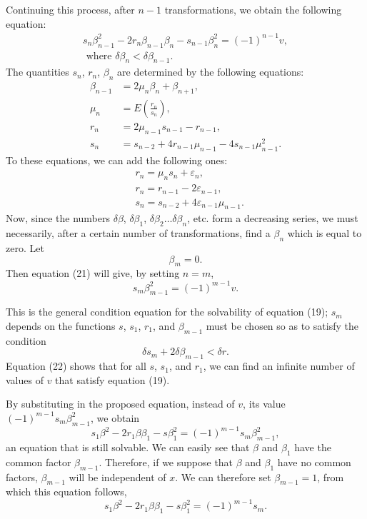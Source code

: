 \documentclass[oneside, 12 pt, leqno]{memoir}
\begin{document}
Continuing this process, after \(n-1\) transformations, we obtain the following equation:
\[\tag{21}\begin{gathered}
s_n \beta_{n-1}^2-2 r_n \beta_{n-1} \beta_n-s_{n-1} \beta_n^2=(-1)^{n-1} v, \\
\text { where } \delta \beta_n<\delta \beta_{n-1}.
\end{gathered}\]
The quantities \(s_n\), \(r_n\), \(\beta_n\) are determined by the following equations:
\[
\begin{aligned}
\beta_{n-1} & =2 \mu_n \beta_n+\beta_{n+1}, \\
\mu_n & =E\left(\frac{r_n}{s_n}\right), \\
r_n & =2 \mu_{n-1} s_{n-1}-r_{n-1}, \\
s_n & =s_{n-2}+4 r_{n-1} \mu_{n-1}-4 s_{n-1} \mu_{n-1}^2.
\end{aligned}
\]
To these equations, we can add the following ones:
\[
\begin{aligned}
& r_n=\mu_n s_n+\varepsilon_n, \\
& r_n=r_{n-1}-2 \varepsilon_{n-1}, \\
& s_n=s_{n-2}+4 \varepsilon_{n-1} \mu_{n-1}.
\end{aligned}
\]
Now, since the numbers \(\delta \beta\), \(\delta \beta_1\), \(\delta {\beta}_2 \dots \delta {\beta}_n\), etc. form a decreasing series, we must necessarily, after a certain number of transformations, find a \(\beta_n\) which is equal to zero.  Let 
\[\beta_m=0.\]
Then equation (21) will give, by setting \(n=m\),
\[\tag{22} s_m \beta_{m-1}^2=(-1)^{m-1} v.\]

This is the general condition equation for the solvability of equation (19); \(s_m\) depends on the functions \(s\), \(s_1\), \(r_1\), and \(\beta_{m-1}\) must be chosen so as to satisfy the condition
\[\delta s_m+2 \delta \beta_{m-1}<\delta r.\]
Equation (22) shows that for all \(s\), \(s_1\), and \(r_1\), we can find an infinite number of values of \(v\) that satisfy equation (19).

By substituting in the proposed equation, instead of \(v\), its value \((-1)^{m-1} s_m \beta_{m-1}^2\), we obtain
\[s_1 \beta^2-2 r_1 \beta \beta_1-s \beta_1^2=(-1)^{m-1} s_m \beta_{m-1}^2,\]
an equation that is still solvable. We can easily see that \(\beta\) and \(\beta_1\) have the common factor \(\beta_{m-1}\). Therefore, if we suppose that \(\beta\) and \(\beta_1\) have no common factors, \(\beta_{m-1}\) will be independent of \(x\). We can therefore set \(\beta_{m-1}=1\), from which this equation follows,
\[s_1 \beta^2-2 r_1 \beta \beta_1-s \beta_1^2=(-1)^{m-1} s_m.\]
\end{document}
